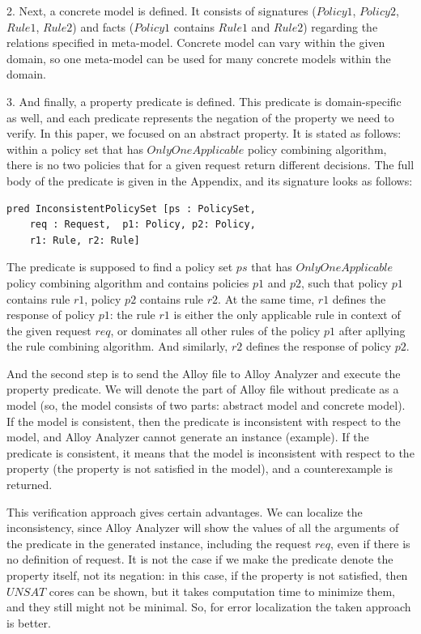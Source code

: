 \documentclass{acm_proc_article-sp}
\begin{document}
2. Next, a concrete model is defined. It consists of signatures ($Policy1$, $Policy2$, $Rule1$, $Rule2$) and facts ($Policy1$ contains $Rule1$ and $Rule2$) regarding the relations specified in meta-model. Concrete model can vary within the given domain, so one meta-model can be used for many concrete models within the domain.

3. And finally, a property predicate is defined. This predicate is domain-specific as well, and each predicate represents the negation of the property we need to verify. In this paper, we focused on an abstract property. It is stated as follows: within a policy set that has $OnlyOneApplicable$ policy combining algorithm, there is no two policies that for a given request return different decisions. The full body of the predicate is given in the Appendix, and its signature looks as follows:

\begin{verbatim}
pred InconsistentPolicySet [ps : PolicySet, 
    req : Request,  p1: Policy, p2: Policy, 
    r1: Rule, r2: Rule]
\end{verbatim}

The predicate is supposed to find a policy set $ps$ that has $OnlyOneApplicable$ policy combining algorithm and contains policies $p1$ and $p2$, such that policy $p1$ contains rule $r1$, policy $p2$ contains rule $r2$. At the same time, $r1$ defines the response of policy $p1$: the rule $ r1$ is either the only applicable rule in context of the given request $req$, or dominates all other rules of the policy $p1$ after apllying the rule combining algorithm. And similarly, $r2$ defines the response of policy $p2$.

And the second step is to send the Alloy file to Alloy Analyzer and execute the property predicate. We will denote the part of Alloy file without predicate as a model (so, the model consists of two parts: abstract model and concrete model). If the model is consistent, then the predicate is inconsistent with respect to the model, and Alloy Analyzer cannot generate an instance (example). If the predicate is consistent, it means that the model is inconsistent with respect to the property (the property is not satisfied in the model), and a counterexample is returned.

This verification approach gives certain advantages. We can localize the inconsistency, since Alloy Analyzer will show the values of all the arguments of the predicate in the generated instance, including the request $req$, even if there is no definition of request. It is not the case if we make the predicate denote the property itself, not its negation: in this case, if the property is not satisfied, then $UNSAT$ cores can be shown, but it takes computation time to minimize them, and they still might not be minimal. So, for error localization the taken approach is better.
\end{document}

